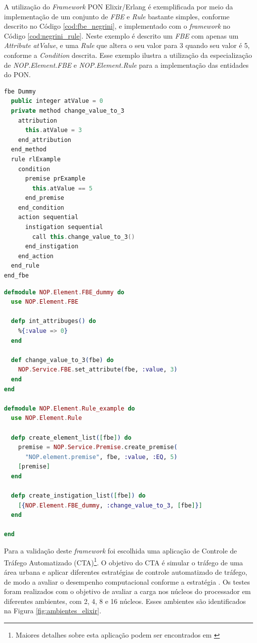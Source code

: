 A utilização do \textit{Framework} PON Elixir/Erlang é exemplificada por meio da
implementação de um conjunto de \textit{FBE} e \textit{Rule} bastante simples,
conforme descrito no Código \ref{cod:fbe_negrini}, e implementado com o
\textit{framework} no Código \ref{cod:negrini_rule}. Neste exemplo é descrito um
\textit{FBE} com apenas um \textit{Attribute} \textit{atValue}, e uma
\textit{Rule} que altera o seu valor para 3 quando seu valor é 5, conforme a
\textit{Condition} descrita. Esse exemplo ilustra a utilização da especialização
de \textit{NOP.Element.FBE} e \textit{NOP.Element.Rule} para a implementação das
entidades do PON.

\begin{lstlisting}[language=C++, caption={Exemplo descrito em \textit{FBE} e \textit{Rule}},
label = {cod:fbe_negrini}, float=htb,
source = {Fonte: Autoria própria}
]
fbe Dummy
  public integer atValue = 0
  private method change_value_to_3
    attribution
      this.atValue = 3
    end_attribution
  end_method
  rule rlExample
    condition
      premise prExample
        this.atValue == 5
      end_premise
    end_condition
    action sequential
      instigation sequential
        call this.change_value_to_3()
      end_instigation
    end_action
  end_rule
end_fbe
\end{lstlisting}

\begin{lstlisting}[language = elixir, caption = {Exemplo de implementação de \textit{Rule} como especialização de \textit{NOP.Element.Rule}}, %float=htb,
    source = {Adaptado de \citeonline{msc_negrini_2019}}, label = {cod:negrini_rule}, float=htb]
defmodule NOP.Element.FBE_dummy do
  use NOP.Element.FBE

  defp int_attribuges() do
    %{:value => 0}
  end

  def change_value_to_3(fbe) do
    NOP.Service.FBE.set_attribute(fbe, :value, 3)
  end
end

defmodule NOP.Element.Rule_example do
  use NOP.Element.Rule

  defp create_element_list([fbe]) do
    premise = NOP.Service.Premise.create_premise(
      "NOP.element.premise", fbe, :value, :EQ, 5)
    [premise]
  end

  defp create_instigation_list([fbe]) do
    [{NOP.Element.FBE_dummy, :change_value_to_3, [fbe]}]
  end

end
\end{lstlisting}
\FloatBarrier

Para a validação deste \textit{framework} foi escolhida uma aplicação de
Controle de Tráfego Automatizado (CTA)\footnote{Maiores detalhes sobre esta
aplicação podem ser encontrados em \cite{renaux_2015}}. O objetivo do CTA é
simular o tráfego de uma área urbana e aplicar diferentes estratégias de
controle automatizado de tráfego, de modo a avaliar o desempenho computacional
conforme a estratégia \cite{msc_negrini_2019}. Os testes foram realizados com o
objetivo de avaliar a carga nos núcleos do processador em diferentes ambientes,
com 2, 4, 8 e 16 núcleos. Esses ambientes são identificados na Figura
\ref{fig:ambientes_elixir}.


